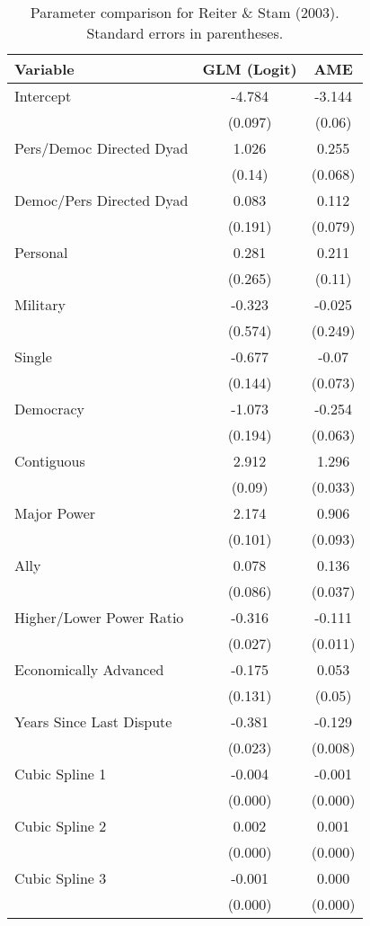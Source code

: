 \begin{table}[ht]
\centering
\begingroup\normalsize
\begin{tabular}{lcc}
 Variable & GLM (Logit) & AME \\ 
  \hline
\hline
Intercept & -4.784 & -3.144 \\ 
   & (0.097) & (0.06) \\ 
  Pers/Democ Directed Dyad & 1.026 & 0.255 \\ 
   & (0.14) & (0.068) \\ 
  Democ/Pers Directed Dyad & 0.083 & 0.112 \\ 
   & (0.191) & (0.079) \\ 
  Personal & 0.281 & 0.211 \\ 
   & (0.265) & (0.11) \\ 
  Military & -0.323 & -0.025 \\ 
   & (0.574) & (0.249) \\ 
  Single & -0.677 & -0.07 \\ 
   & (0.144) & (0.073) \\ 
  Democracy & -1.073 & -0.254 \\ 
   & (0.194) & (0.063) \\ 
  Contiguous & 2.912 & 1.296 \\ 
   & (0.09) & (0.033) \\ 
  Major Power & 2.174 & 0.906 \\ 
   & (0.101) & (0.093) \\ 
  Ally & 0.078 & 0.136 \\ 
   & (0.086) & (0.037) \\ 
  Higher/Lower Power Ratio & -0.316 & -0.111 \\ 
   & (0.027) & (0.011) \\ 
  Economically Advanced & -0.175 & 0.053 \\ 
   & (0.131) & (0.05) \\ 
  Years Since Last Dispute & -0.381 & -0.129 \\ 
   & (0.023) & (0.008) \\ 
  Cubic Spline 1 & -0.004 & -0.001 \\ 
   & (0.000) & (0.000) \\ 
  Cubic Spline 2 & 0.002 & 0.001 \\ 
   & (0.000) & (0.000) \\ 
  Cubic Spline 3 & -0.001 & 0.000 \\ 
   & (0.000) & (0.000) \\ 
   \hline
\hline
\end{tabular}
\endgroup
\caption{Parameter comparison for Reiter \& Stam (2003). Standard errors in parentheses.} 
\label{tab:reiter_stam_coef}
\end{table}
